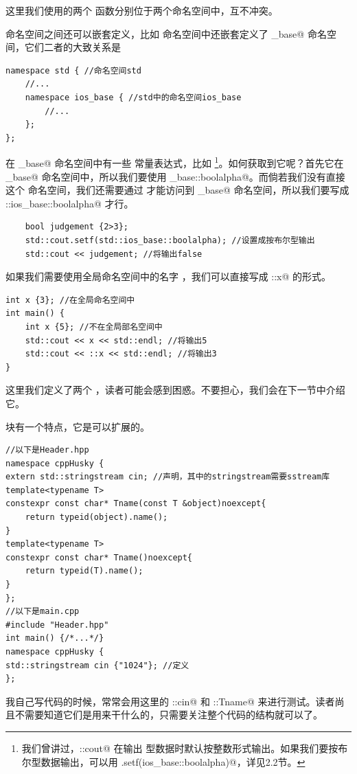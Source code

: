 这里我们使用的两个 \lstinline@max@ 函数分别位于两个命名空间中，互不冲突。\par
命名空间之间还可以嵌套定义，比如 \lstinline@std@ 命名空间中还嵌套定义了 \lstinline@ios_base@ 命名空间，它们二者的大致关系是
\begin{lstlisting}
namespace std { //命名空间std
    //...
    namespace ios_base { //std中的命名空间ios_base
        //...
    };
};
\end{lstlisting}\par
在 \lstinline@ios_base@ 命名空间中有一些 \lstinline@fmtflags@ 常量表达式，比如 \lstinline@boolalpha@\footnote{我们曾讲过，\lstinline@std::cout@ 在输出 \lstinline@bool@ 型数据时默认按整数形式输出。如果我们要按布尔型数据输出，可以用 \lstinline@cout.setf(ios_base::boolalpha)@，详见2.2节。}。如何获取到它呢？首先它在 \lstinline@ios_base@ 命名空间中，所以我们要使用 \lstinline@ios_base::boolalpha@。而倘若我们没有直接 \lstinline@using@ 这个 \lstinline@std@ 命名空间，我们还需要通过 \lstinline@std@ 才能访问到 \lstinline@ios_base@ 命名空间，所以我们要写成 \lstinline@std::ios_base::boolalpha@ 才行。\par
\begin{lstlisting}
    bool judgement {2>3};
    std::cout.setf(std::ios_base::boolalpha); //设置成按布尔型输出
    std::cout << judgement; //将输出false
\end{lstlisting}\par
如果我们需要使用全局命名空间中的名字 \lstinline@x@，我们可以直接写成 \lstinline@::x@ 的形式。
\begin{lstlisting}
int x {3}; //在全局命名空间中
int main() {
    int x {5}; //不在全局部名空间中
    std::cout << x << std::endl; //将输出5
    std::cout << ::x << std::endl; //将输出3
}
\end{lstlisting}
这里我们定义了两个 \lstinline@x@，读者可能会感到困惑。不要担心，我们会在下一节中介绍它。\par
\lstinline@namespace@ 块有一个特点，它是可以扩展的。
\begin{lstlisting}
//以下是Header.hpp
namespace cppHusky {
extern std::stringstream cin; //声明，其中的stringstream需要sstream库
template<typename T>
constexpr const char* Tname(const T &object)noexcept{
    return typeid(object).name();
}
template<typename T>
constexpr const char* Tname()noexcept{
    return typeid(T).name();
}
};
//以下是main.cpp
#include "Header.hpp"
int main() {/*...*/}
namespace cppHusky {
std::stringstream cin {"1024"}; //定义
};
\end{lstlisting}
我自己写代码的时候，常常会用这里的 \lstinline@cppHusky::cin@ 和 \lstinline@cppHusky::Tname@ 来进行测试。读者尚且不需要知道它们是用来干什么的，只需要关注整个代码的结构就可以了。\par
